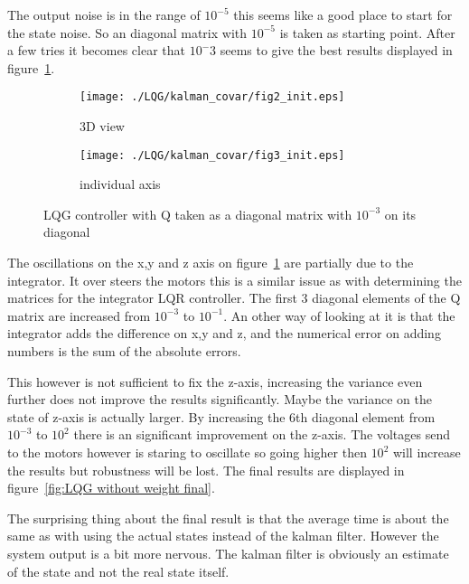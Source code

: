The output noise is in the range of $10^{-5}$ this seems like a good place to start for the state noise. So an diagonal matrix with $10^{-5}$ is taken as starting point. After a few tries it becomes clear that $10^-{3}$ seems to give the best results displayed in figure~\ref{fig:LQG step 1}.

\begin{figure}[H]
	\centering
	\begin{subfigure}[b]{0.3\textwidth}
		\texttt{[image: ./LQG/kalman\_covar/fig2\_init.eps]}
		\caption{3D view}
	\end{subfigure}
	\begin{subfigure}[b]{0.3\textwidth}
		\texttt{[image: ./LQG/kalman\_covar/fig3\_init.eps]}
		\caption{individual axis}
	\end{subfigure}
	\caption{LQG controller with Q taken as a diagonal matrix with $10^{-3}$ on its diagonal}\label{fig:LQG step 1}
\end{figure}

The oscillations on the x,y and z axis on figure~\ref{fig:LQG step 1} are partially due to the integrator. It over steers the motors this is a similar issue as with determining the matrices for the integrator LQR controller. The first 3 diagonal elements of the Q matrix are increased from $10^{-3}$ to $10^{-1}$. An other way of looking at it is that the integrator adds the difference on x,y and z, and the numerical error on adding numbers is the sum of the absolute errors.

This however is not sufficient to fix the z-axis, increasing the variance even further does not improve the results significantly. Maybe the variance on the  state of z-axis is actually larger. By increasing the 6th diagonal element from $10^{-3}$ to $10^{2}$ there is an significant improvement on the z-axis. The voltages send to the motors however is staring to oscillate so going higher then $10^2$ will increase the results but robustness will be lost. The final results are displayed in figure~\ref{fig:LQG without weight final}.

The surprising thing about the final result is that the average time is about the same as with using the actual states instead of the kalman filter. However the system output is a bit more nervous. The kalman filter is obviously an estimate of the state and not the real state itself.

